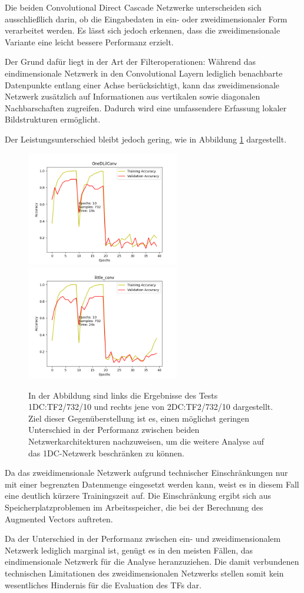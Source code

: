 Die beiden Convolutional Direct Cascade Netzwerke unterscheiden sich ausschließlich darin, ob die Eingabedaten in ein- oder zweidimensionaler 
Form verarbeitet werden. Es lässt sich jedoch erkennen, dass die zweidimensionale Variante eine leicht bessere Performanz erzielt.

Der Grund dafür liegt in der Art der Filteroperationen: Während das eindimensionale Netzwerk in den Convolutional Layern lediglich benachbarte 
Datenpunkte entlang einer Achse berücksichtigt, kann das zweidimensionale Netzwerk zusätzlich auf Informationen aus vertikalen sowie diagonalen 
Nachbarschaften zugreifen. Dadurch wird eine umfassendere Erfassung lokaler Bildstrukturen ermöglicht.

Der Leistungsunterschied bleibt jedoch gering, wie in Abbildung \ref{fig:dim} dargestellt.

\begin{figure}[htpb]
    \includegraphics[height=5cm]{../../Plots/ba_plots/dimensionality/1dim_tr.png}
    \includegraphics[height=5cm]{../../Plots/ba_plots/dimensionality/2dim_tr.png}
    \caption{\label{fig:dim} 
    \small{In der Abbildung sind links die Ergebnisse des Tests 1DC:TF2/732/10 und rechts jene von 2DC:TF2/732/10 dargestellt. Ziel dieser 
    Gegenüberstellung ist es, einen möglichst geringen Unterschied in der Performanz zwischen beiden Netzwerkarchitekturen nachzuweisen, um 
    die weitere Analyse auf das 1DC-Netzwerk beschränken zu können.}}
\end{figure}

Da das zweidimensionale Netzwerk aufgrund technischer Einschränkungen nur mit einer begrenzten Datenmenge eingesetzt werden kann, weist es in 
diesem Fall eine deutlich kürzere Trainingszeit auf. Die Einschränkung ergibt sich aus Speicherplatzproblemen im Arbeitsspeicher, die bei der 
Berechnung des Augmented Vectors auftreten.

Da der Unterschied in der Performanz zwischen ein- und zweidimensionalem Netzwerk lediglich marginal ist, genügt es in den meisten Fällen, das 
eindimensionale Netzwerk für die Analyse heranzuziehen. Die damit verbundenen technischen Limitationen des zweidimensionalen Netzwerks stellen 
somit kein wesentliches Hindernis für die Evaluation des TFs dar.
